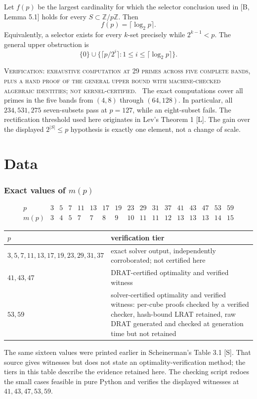 \documentclass[10pt]{article}
\newcommand{\ZZ}{\mathbb Z}
\newcommand{\tier}[1]{\par\smallskip\noindent\textsc{Verification: #1.}\ }
\theoremstyle{plain}
\begin{document}
Let $f(p)$ be the largest cardinality for which the selector conclusion used
in [B, Lemma 5.1] holds for every $S\subset\ZZ/p\ZZ$. Then
\[
                         f(p)=\lceil\log_2p\rceil.
\]
Equivalently, a selector exists for every $k$-set precisely while
$2^{k-1}<p$. The general upper obstruction is
\[
 \{0\}\cup\{\lceil p/2^i\rceil:1\leq i\leq\lceil\log_2p\rceil\}.
\]
\tier{exhaustive computation at 29 primes across five complete bands, plus a
hand proof of the general upper bound with machine-checked algebraic
identities; not kernel-certified}
The exact computations cover all primes in the five bands from $(4,8)$
through $(64,128)$. In particular, all $234{,}531{,}275$ seven-subsets pass
at $p=127$, while an eight-subset fails. The rectification threshold used
here originates in Lev's Theorem 1 [L]. The gain over the displayed
$2^{|S|}\leq p$ hypothesis is exactly one element, not a change of scale.

\part{Data}

\section{Exact values of \texorpdfstring{$m(p)$}{m(p)}}

\[
\begin{array}{c|rrrrrrrrrrrrrrrr}
p&3&5&7&11&13&17&19&23&29&31&37&41&43&47&53&59\\ \hline
m(p)&3&4&5&7&7&8&9&10&11&11&12&13&13&13&14&15
\end{array}
\]
\begin{center}
\begin{tabular}{@{}p{}|p{}@{}}
$p$&verification tier\\ \hline
$3,5,7,11,13,17,19,23,29,31,37$&
exact solver output, independently corroborated; not certified here\\
$41,43,47$&DRAT-certified optimality and verified witness\\
$53,59$&solver-certified optimality and verified witness: per-cube proofs
checked by a verified checker, hash-bound LRAT retained, raw DRAT generated
and checked at generation time but not retained
\end{tabular}
\end{center}
The same sixteen values were printed earlier in Scheinerman's Table 3.1 [S].
That source gives witnesses but does not state an optimality-verification
method; the tiers in this table describe the evidence retained here.
The checking script redoes the small cases feasible in pure Python and verifies
the displayed witnesses at $41,43,47,53,59$.
\end{document}
